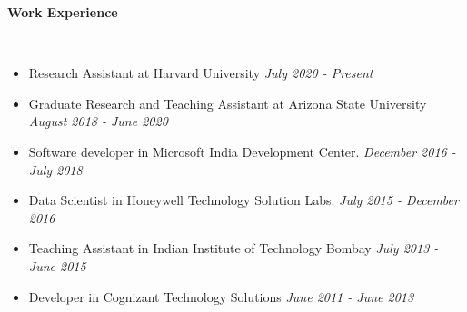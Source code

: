 \documentclass[a4paper,11pt]{article}
\newcommand{\lsep}{-0.5cm}
\newcommand{\resheading}[1]{{\small \colorbox{mygrey}{\begin{minipage}{0.975\textwidth}{\textbf{#1 \vphantom{p\^{E}}}}\end{minipage}}}}
\begin{document}
\resheading{\textbf{\large Work Experience}}\\[\lsep]
\begin{description}
		\item 
	\begin{itemize}
		\item Research Assistant at Harvard University \hfill \textit{July 2020 - Present}
	\end{itemize}
	\item 
\begin{itemize}
	\item Graduate Research and Teaching Assistant at Arizona State University \hfill \textit{August 2018 - June 2020}
\end{itemize}
	\item 
	\begin{itemize}
		\item Software developer in Microsoft India Development Center. \hfill \textit{December 2016 - July 2018}
	\end{itemize}
	\item 
	\begin{itemize}
		\item Data Scientist in Honeywell Technology Solution Labs. \hfill \textit{July 2015 - December 2016}
	\end{itemize}
	\item 
	\begin{itemize}
		\item Teaching Assistant in Indian Institute of Technology Bombay \hfill \textit{July 2013 - June 2015}
	\end{itemize}
	\item 
	\begin{itemize}
		\item Developer in Cognizant Technology Solutions \hfill \textit{June 2011 - June 2013}
	\end{itemize}
\end{description}
\end{document}

